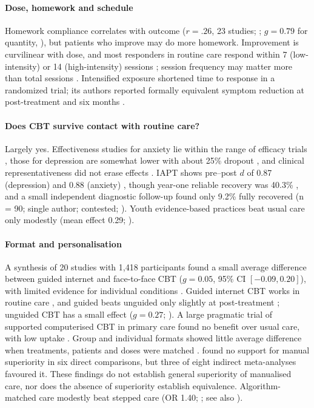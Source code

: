 \paragraph{Dose, homework and schedule} Homework compliance correlates with outcome ($r=.26$, 23 studies; \citealp{mausbach2010homework}; $g=0.79$ for quantity, \citealp{kazantzis2016quality}), but patients who improve may do more homework.
Improvement is curvilinear with dose, and most responders in routine care respond within 7 (low-intensity) or 14 (high-intensity) sessions \citep{robinson2020dose}; session frequency may matter more than total sessions \citep{cuijpers2013sessions}.
Intensified exposure shortened time to response in a randomized trial; its authors reported formally equivalent symptom reduction at post-treatment and six months \citep{pittig2021intensified}.

\paragraph{Does CBT survive contact with routine care?} Largely yes.
Effectiveness studies for anxiety lie within the range of efficacy trials \citep{Stewart2009Anxiety}, those for depression are somewhat lower with about 25\% dropout \citep{Hans2013Depression}, and clinical representativeness did not erase effects \citep{shadish2000representative}.
IAPT shows pre--post $d$ of 0.87 (depression) and 0.88 (anxiety) \citep{wakefield2021iapt}, though year-one reliable recovery was 40.3\% \citep{Gyani2013IAPT}, and a small independent diagnostic follow-up found only 9.2\% fully recovered (n = 90; single author; contested; \citealp{scott2018iapt}).
Youth evidence-based practices beat usual care only modestly (mean effect 0.29; \citealp{weisz2013youthusual}).

\paragraph{Format and personalisation} A synthesis of 20 studies with 1,418 participants found a small average difference between guided internet and face-to-face CBT ($g=0.05$, 95\% CI $[-0.09,0.20]$), with limited evidence for individual conditions \citep{carlbring2018icbt}.
Guided internet CBT works in routine care \citep{etzelmueller2020routine}, and guided beats unguided only slightly at post-treatment \citep{karyotaki2021icbtnma}; unguided CBT has a small effect ($g=0.27$; \citealp{karyotaki2017selfguided}).
A large pragmatic trial of supported computerised CBT in primary care found no benefit over usual care, with low uptake \citep{gilbody2015reeact}.
Group and individual formats showed little average difference when treatments, patients and doses were matched \citep{burlingame2016group}.
\citet{truijens2019manual} found no support for manual superiority in six direct comparisons, but three of eight indirect meta-analyses favoured it.
These findings do not establish general superiority of manualised care, nor does the absence of superiority establish equivalence.
Algorithm-matched care modestly beat stepped care (OR 1.40; \citealp{delgadillo2022stratified}; see also \citealp{firth2015stepped}).

